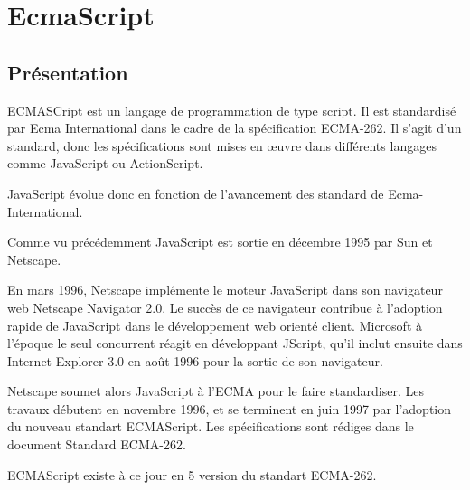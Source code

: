 \section{EcmaScript}
\label{ch:ecmascript}

\subsection{Présentation}

ECMASCript est un langage de programmation de type script. Il est standardisé par Ecma International dans le cadre de la spécification ECMA-262. Il s’agit d’un standard, donc les spécifications sont mises en œuvre dans différents langages comme JavaScript ou ActionScript.

JavaScript évolue donc en fonction de l'avancement des standard de Ecma-International.

Comme vu précédemment JavaScript est sortie en décembre 1995 par Sun et Netscape.

En mars 1996, Netscape implémente le moteur JavaScript dans son navigateur web Netscape Navigator 2.0. Le succès de ce navigateur contribue à l’adoption rapide de JavaScript dans le développement web orienté client. Microsoft à l’époque le seul concurrent réagit en développant JScript, qu’il inclut ensuite dans Internet Explorer 3.0 en août 1996 pour la sortie de son navigateur.

Netscape soumet alors JavaScript à l’ECMA pour le faire standardiser. Les travaux débutent en novembre 1996, et se terminent en juin 1997 par l’adoption du nouveau standart ECMAScript. Les spécifications sont rédiges dans le document Standard ECMA-262.

ECMAScript existe à ce jour en 5 version du standart ECMA-262.